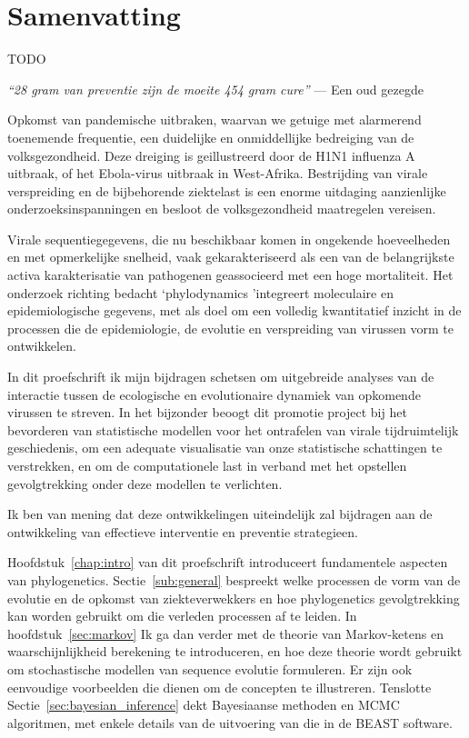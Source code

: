 
\chapter*{Samenvatting}

TODO

\bigskip{}

\emph{``28 gram van preventie zijn de moeite 454 gram cure''}
--- Een oud gezegde

\bigskip{}

Opkomst van pandemische uitbraken, waarvan we getuige met alarmerend toenemende frequentie, een duidelijke en onmiddellijke bedreiging van de volksgezondheid.
Deze dreiging is geillustreerd door de H1N1 influenza A uitbraak, of het Ebola-virus uitbraak in West-Afrika.
Bestrijding van virale verspreiding en de bijbehorende ziektelast is een enorme uitdaging aanzienlijke onderzoeksinspanningen en besloot de volksgezondheid maatregelen vereisen.

Virale sequentiegegevens, die nu beschikbaar komen in ongekende hoeveelheden en met opmerkelijke snelheid, vaak gekarakteriseerd als een van de belangrijkste activa karakterisatie van pathogenen geassocieerd met een hoge mortaliteit.
Het onderzoek richting bedacht `phylodynamics 'integreert moleculaire en epidemiologische gegevens, met als doel om een volledig kwantitatief inzicht in de processen die de epidemiologie, de evolutie en verspreiding van virussen vorm te ontwikkelen.

In dit proefschrift ik mijn bijdragen schetsen om uitgebreide analyses van de interactie tussen de ecologische en evolutionaire dynamiek van opkomende virussen te streven.
In het bijzonder beoogt dit promotie project bij het bevorderen van statistische modellen voor het ontrafelen van virale tijdruimtelijk geschiedenis, om een adequate visualisatie van onze statistische schattingen te verstrekken, en om de computationele last in verband met het opstellen gevolgtrekking onder deze modellen te verlichten.

Ik ben van mening dat deze ontwikkelingen uiteindelijk zal bijdragen aan de ontwikkeling van effectieve interventie en preventie strategieen.

Hoofdstuk~\ref {chap:intro} van dit proefschrift introduceert fundamentele aspecten van phylogenetics.
Sectie~\ref{sub:general} bespreekt welke processen de vorm van de evolutie en de opkomst van ziekteverwekkers en hoe phylogenetics gevolgtrekking kan worden gebruikt om die verleden processen af te leiden.
In hoofdstuk~\ref{sec:markov} Ik ga dan verder met de theorie van Markov-ketens en waarschijnlijkheid berekening te introduceren, en hoe deze theorie wordt gebruikt om stochastische modellen van sequence evolutie formuleren.
Er zijn ook eenvoudige voorbeelden die dienen om de concepten te illustreren.
Tenslotte Sectie~\ref{sec:bayesian_inference} dekt Bayesiaanse methoden en MCMC algoritmen, met enkele details van de uitvoering van die in de BEAST software.

